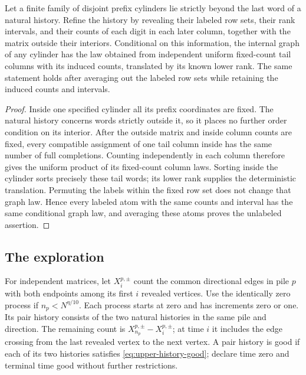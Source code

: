 \begin{lemma}\label{lem:upper-induced-law}
Let a finite family of disjoint prefix cylinders lie strictly beyond
the last word of a natural history. Refine the history by revealing
their labeled row sets, their rank intervals, and their counts of
each digit in each later column, together with the matrix outside
their interiors. Conditional on this information, the internal
graph of any cylinder has the law obtained from independent uniform
fixed-count tail columns with its induced counts, translated by its
known lower rank. The same statement holds after averaging out the
labeled row sets while retaining the induced counts and intervals.
\end{lemma}
\begin{proof}
Inside one specified cylinder all its prefix coordinates are fixed.
The natural history concerns words strictly outside it, so it places
no further order condition on its interior. After the outside matrix
and inside column counts are fixed, every compatible assignment of
one tail column inside has the same number of full completions.
Counting independently in each column therefore gives the uniform
product of its fixed-count column laws. Sorting inside the cylinder
sorts precisely these tail words; its lower rank supplies the
deterministic translation. Permuting the labels within the fixed
row set does not change that graph law. Hence every labeled atom
with the same counts and interval has the same conditional graph
law, and averaging these atoms proves the unlabeled assertion.
\end{proof}

\subsection{The exploration}
For independent matrices, let $X_i^{p,\pm}$ count the common
directional edges in pile $p$ with both endpoints among its first
$i$ revealed vertices. Use the identically zero process if
$n_p<N^{\eta/10}$. Each process starts at zero and has increments
zero or one. Its pair history consists of the two natural histories
in the same pile and direction. The remaining count is
$X_{n_p}^{p,\pm}-X_i^{p,\pm}$; at time $i$ it includes the edge
crossing from the last revealed vertex to the next vertex.
A pair history is good if each of its two histories satisfies
\eqref{eq:upper-history-good}; declare time zero and terminal time
good without further restrictions.

